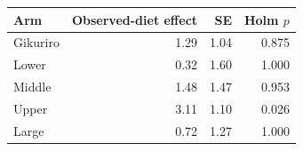 \begin{tabular}{lrrr}
\toprule
Arm & Observed-diet effect & SE & Holm $p$ \\
\midrule
Gikuriro & 1.29 & 1.04 & 0.875 \\
Lower & 0.32 & 1.60 & 1.000 \\
Middle & 1.48 & 1.47 & 0.953 \\
Upper & 3.11 & 1.10 & 0.026 \\
Large & 0.72 & 1.27 & 1.000 \\
\bottomrule
\end{tabular}

